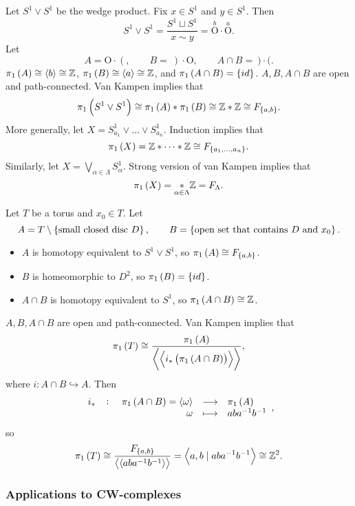 \begin{example*}
Let $ S^1 \vee S^1 $ be the wedge product. Fix $ x \in S^1 $ and $ y \in S^1 $. Then
$$ S^1 \vee S^1 = \dfrac{S^1 \sqcup S^1}{x \sim y} = \overset{b}{\text{O}}\cdot\overset{a}{\text{O}}. $$
Let
$$ A = \text{O}\cdot(, \qquad B = \ )\cdot\text{O}, \qquad A \cap B = \ )\cdot(. $$
$ \pi_1\br{A} \cong \abr{b} \cong \Z $, $ \pi_1\br{B} \cong \abr{a} \cong \Z $, and $ \pi_1\br{A \cap B} = \cbr{id} $. $ A, B, A \cap B $ are open and path-connected. Van Kampen implies that
$$ \pi_1\br{S^1 \vee S^1} \cong \pi_1\br{A} * \pi_1\br{B} \cong \Z * \Z \cong F_{\cbr{a, b}}. $$
More generally, let $ X = S_{a_1}^1 \vee \dots \vee S_{a_n}^1 $. Induction implies that
$$ \pi_1\br{X} = \Z * \dots * \Z \cong F_{\cbr{a_1, \dots, a_n}}. $$
Similarly, let $ X = \bigvee_{\alpha \in \Lambda} S_\alpha^1 $. Strong version of van Kampen implies that
$$ \pi_1\br{X} = \underset{\alpha \in \Lambda}{*} \Z = F_\Lambda. $$
\end{example*}

\begin{example*}
Let $ T $ be a torus and $ x_0 \in T $. Let
$$ A = T \setminus \cbr{\text{small closed disc} \ D}, \qquad B = \cbr{\text{open set that contains} \ D \ \text{and} \ x_0}. $$
\begin{itemize}
\item $ A $ is homotopy equivalent to $ S^1 \vee S^1 $, so $ \pi_1\br{A} \cong F_{\cbr{a, b}} $.
\item $ B $ is homeomorphic to $ D^2 $, so $ \pi_1\br{B} = \cbr{id} $.
\item $ A \cap B $ is homotopy equivalent to $ S^1 $, so $ \pi_1\br{A \cap B} \cong \Z $.
\end{itemize}
$ A, B, A \cap B $ are open and path-connected. Van Kampen implies that
$$ \pi_1\br{T} \cong \dfrac{\pi_1\br{A}}{\abr{\abr{i_*\br{\pi_1\br{A \cap B}}}}}, $$
where $ i : A \cap B \hookrightarrow A $. Then
$$ \function[i_*]{\pi_1\br{A \cap B} = \abr{\omega}}{\pi_1\br{A}}{\omega}{aba^{-1}b^{-1}}, $$
so
$$ \pi_1\br{T} \cong \dfrac{F_{\cbr{a, b}}}{\abr{\abr{aba^{-1}b^{-1}}}} = \abr{a, b \mid aba^{-1}b^{-1}} \cong \Z^2. $$
\end{example*}

\pagebreak

\subsubsection{Applications to CW-complexes}

